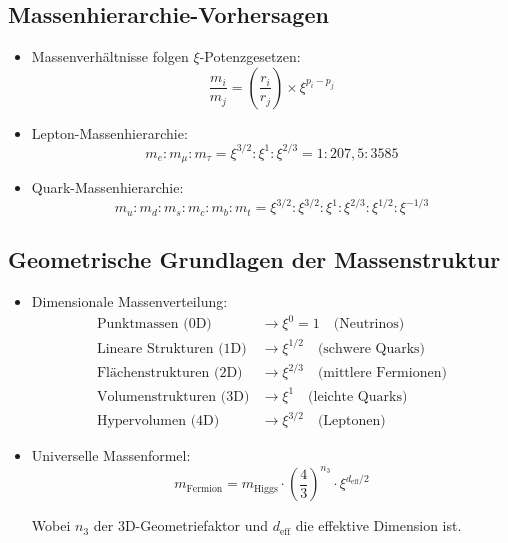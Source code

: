 \documentclass[12pt,a4paper]{article}
\begin{document}
\subsection{Massenhierarchie-Vorhersagen}
\begin{itemize}
	\item Massenverhältnisse folgen $\xi$-Potenzgesetzen:
	\begin{equation}
		\frac{m_i}{m_j} = \left(\frac{r_i}{r_j}\right) \times \xi^{p_i - p_j}
	\end{equation}
	
	\item Lepton-Massenhierarchie:
	\begin{equation}
		m_e : m_\mu : m_\tau = \xi^{3/2} : \xi^1 : \xi^{2/3} = 1 : 207,5 : 3585
	\end{equation}
	
	\item Quark-Massenhierarchie:
	\begin{equation}
		m_u : m_d : m_s : m_c : m_b : m_t = \xi^{3/2} : \xi^{3/2} : \xi^1 : \xi^{2/3} : \xi^{1/2} : \xi^{-1/3}
	\end{equation}
\end{itemize}

\subsection{Geometrische Grundlagen der Massenstruktur}
\begin{itemize}
	\item Dimensionale Massenverteilung:
	\begin{align}
		\text{Punktmassen (0D)} &\rightarrow \xi^0 = 1 \quad \text{(Neutrinos)}\\
		\text{Lineare Strukturen (1D)} &\rightarrow \xi^{1/2} \quad \text{(schwere Quarks)}\\
		\text{Flächenstrukturen (2D)} &\rightarrow \xi^{2/3} \quad \text{(mittlere Fermionen)}\\
		\text{Volumenstrukturen (3D)} &\rightarrow \xi^1 \quad \text{(leichte Quarks)}\\
		\text{Hypervolumen (4D)} &\rightarrow \xi^{3/2} \quad \text{(Leptonen)}
	\end{align}
	
	\item Universelle Massenformel:
	\begin{equation}
		m_{\text{Fermion}} = m_{\text{Higgs}} \cdot \left(\frac{4}{3}\right)^{n_3} \cdot \xi^{d_{\text{eff}}/2}
	\end{equation}
	
	Wobei $n_3$ der 3D-Geometriefaktor und $d_{\text{eff}}$ die effektive Dimension ist.
\end{itemize}
\end{document}
